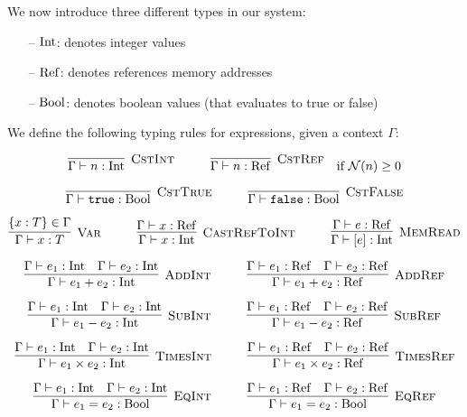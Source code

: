 We now introduce three different types in our system:

\begin{itemize}
	\itemsep0em
	\item[--] $\mathrm{Int}{}$: denotes integer values
	\item[--] $\mathrm{Ref}{}$: denotes references \ie{} memory addresses
	\item[--] $\mathrm{Bool}{}$: denotes boolean values (that evaluates to true or false)
\end{itemize}

We define the following typing rules for expressions, given a context $\Gamma$:

\[
\Rule{CstInt}{\Gamma \vdash n: \Int}{}
\hspace*{1cm}
\Rule{CstRef}{\Gamma \vdash n: \Ref}{} \quad \text{if $\N(n) \geq 0$}
\]

\[
\Rule{CstTrue}{\Gamma \vdash \texttt{true}: \Bool}{}
\hspace*{1cm}
\Rule{CstFalse}{\Gamma \vdash \texttt{false}: \Bool}{}
\]

\[
\Rule{Var}{\Gamma \vdash x: T}{\lbrace x: T \rbrace \in \Gamma}
\hspace*{1cm}
\Rule{CastRefToInt}{\Gamma \vdash x: \Int}{\Gamma \vdash x: \Ref}
\hspace*{1cm}
\Rule{MemRead}{\Gamma \vdash [e]: \Int}{\Gamma \vdash e: \Ref}
\]

\[
\Rule{AddInt}{\Gamma \vdash e_1 + e_2: \Int}{\Gamma \vdash e_1: \Int \quad \Gamma \vdash e_2: \Int}
\hspace*{1cm}
\Rule{AddRef}{\Gamma \vdash e_1 + e_2: \Ref}{\Gamma \vdash e_1: \Ref \quad \Gamma \vdash e_2: \Ref}
\]

\[
\Rule{SubInt}{\Gamma \vdash e_1 - e_2: \Int}{\Gamma \vdash e_1: \Int \quad \Gamma \vdash e_2: \Int}
\hspace*{1cm}
\Rule{SubRef}{\Gamma \vdash e_1 - e_2: \Ref}{\Gamma \vdash e_1: \Ref \quad \Gamma \vdash e_2: \Ref}
\]

\[
\Rule{TimesInt}{\Gamma \vdash e_1 \times e_2: \Int}{\Gamma \vdash e_1: \Int \quad \Gamma \vdash e_2: \Int}
\hspace*{1cm}
\Rule{TimesRef}{\Gamma \vdash e_1 \times e_2: \Ref}{\Gamma \vdash e_1: \Ref \quad \Gamma \vdash e_2: \Ref}
\]

\[
\Rule{EqInt}{\Gamma \vdash e_1 = e_2: \Bool}{\Gamma \vdash e_1: \Int \quad \Gamma \vdash e_2: \Int}
\hspace*{1cm}
\Rule{EqRef}{\Gamma \vdash e_1 = e_2: \Bool}{\Gamma \vdash e_1: \Ref \quad \Gamma \vdash e_2: \Ref}
\]

